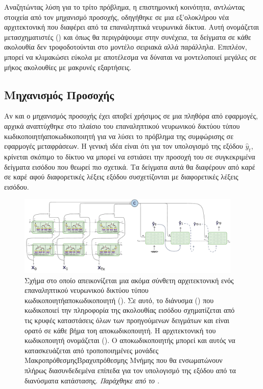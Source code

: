 Αναζητώντας λύση για το τρίτο πρόβλημα, η επιστημονική κοινότητα, αντλώντας στοιχεία από τον μηχανισμό προσοχής, οδηγήθηκε σε μια εξ'ολοκλήρου νέα αρχιτεκτονική που διαφέρει από τα επαναληπτικά νευρωνικά δίκτυα. Αυτή ονομάζεται μετασχηματιστές ()\cite{transformers_attention_is_all_you_need} και όπως θα περιγράψουμε στην συνέχεια, τα δείγματα σε κάθε ακολουθία δεν τροφοδοτούνται στο μοντέλο σειριακά αλλά παράλληλα. Επιπλέον, μπορεί να κλιμακώσει εύκολα με αποτέλεσμα να δύναται να μοντελοποιεί μεγάλες σε μήκος ακολουθίες με μακρυνές εξαρτήσεις.\par

\subsection{Μηχανισμός Προσοχής}
Αν και ο μηχανισμός προσοχής έχει αποβεί χρήσιμος σε μια πληθόρα από εφαρμογές, αρχικά αναπτύχθηκε στο πλαίσιο του επαναληπτικού νευρωνικού δικτύου τύπου κωδικοποιητή\textendash αποκωδικοποιητή για να λύσει το πρόβλημα της συμφώρισης σε εφαρμογές μεταφράσεων. Η γενική ιδέα είναι ότι για τον υπολογισμό της εξόδου $\hat{y}_t$, κρίνεται σκόπιμο το δίκτυο να μπορεί να εστιάσει την προσοχή του σε συγκεκριμένα δείγματα εισόδου που θεωρεί πιο σχετικά. Τα δείγματα αυτά θα διαφέρουν από καρέ σε καρέ αφού διαφορετικές λέξεις εξόδου συσχετίζονται με διαφορετικές λέξεις εισόδου.\par

\begin{figure}[h]
  \centering
  \includegraphics[width=0.95\textwidth]{images/chapter theoritical background/rnn_peaky_encoder_decoder_complex.pdf}
  \caption{Σχήμα στο οποίο απεικονίζεται μια ακόμα σύνθετη αρχιτεκτονική ενός επαναληπτικού νευρωνικού δικτύου τύπου κωδικοποιητή\textendash αποκωδικοποιητή (). Σε αυτό, το διάνυσμα () που κωδικοποιεί την πληροφορία της ακολουθίας εισόδου σχηματίζεται από τις κρυφές καταστάσεις όλων των προηγούμενων δειγμάτων και είναι ορατό σε κάθε βήμα τοη αποκωδικοποιητή. Η αρχιτεκτονική του κωδικοποιητή ονομάζεται  (). Ο αποκωδικοποιητής μπορεί και αυτός να κατασκευάζεται από τροποποιημένες μονάδες Μακροπρόθεσμης\textendash Βραχυπρόθεσμης Μνήμης που θα ενσωματώνουν πλήρως διασυνδεδεμένα επίπεδα για τον υπολογισμό της εξόδου από τα διανύσματα κατάστασης. \textit{Παράχθηκε από το \href{https://inkscape.org/}{}}.}
  \label{fig:rnn_peaky_encoder_decoder_no_attention}
\end{figure}

